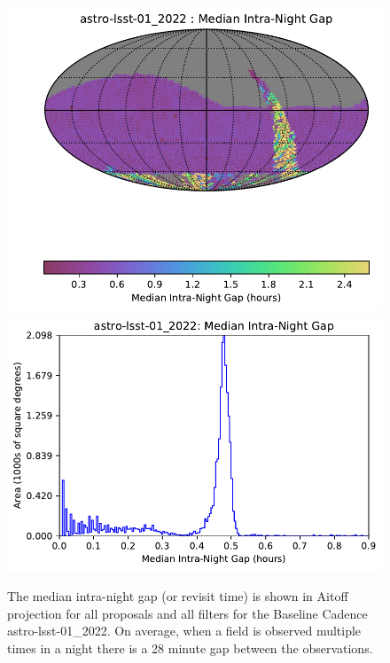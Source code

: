 \documentclass[DM,lsstdraft,authoryear,toc]{lsstdoc}
\begin{document}
\begin{figure}[t!]
\vskip -0.0in
\includegraphics[angle=0,width=0.49\hsize,clip]{figures/astro-lsst-01_2022_Median_Intra-Night_Gap_HEAL_SkyMap.pdf}
\includegraphics[angle=0,width=0.49\hsize,clip]{figures/astro-lsst-01_2022-median_intra_night_gap_hist.pdf}
\vskip -0.1in
\caption{The median intra-night gap (or revisit time) is shown in Aitoff projection
for all proposals and all filters for the Baseline Cadence astro-lsst-01\_2022.
On average, when a field is observed multiple times in a night there is a 28 minute gap between the observations.}
\label{fig:baseline_InterGapAll}
\end{figure}
\end{document}
